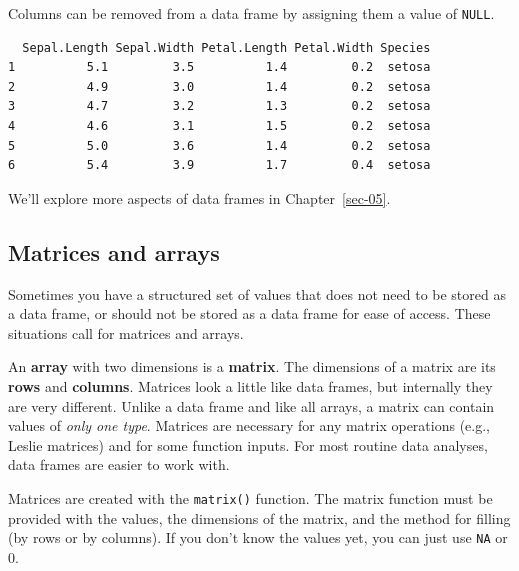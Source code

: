 \documentclass[
  13,
  letterpaper,
]{report}
\newenvironment{Shaded}{\begin{snugshade}}{\end{snugshade}}
\newcommand{\ConstantTok}[1]{\textcolor[rgb]{0.56,0.35,0.01}{#1}}
\newcommand{\FunctionTok}[1]{\textcolor[rgb]{0.28,0.35,0.67}{#1}}
\newcommand{\NormalTok}[1]{\textcolor[rgb]{0.00,0.23,0.31}{#1}}
\newcommand{\OtherTok}[1]{\textcolor[rgb]{0.00,0.23,0.31}{#1}}
\newcommand{\SpecialCharTok}[1]{\textcolor[rgb]{0.37,0.37,0.37}{#1}}
\begin{document}
Columns can be removed from a data frame by assigning them a value of
\texttt{NULL}.

\begin{Shaded}
\end{Shaded}

\begin{verbatim}
  Sepal.Length Sepal.Width Petal.Length Petal.Width Species
1          5.1         3.5          1.4         0.2  setosa
2          4.9         3.0          1.4         0.2  setosa
3          4.7         3.2          1.3         0.2  setosa
4          4.6         3.1          1.5         0.2  setosa
5          5.0         3.6          1.4         0.2  setosa
6          5.4         3.9          1.7         0.4  setosa
\end{verbatim}

We'll explore more aspects of data frames in Chapter~\ref{sec-05}.

\subsection{Matrices and arrays}\label{sec-03-struct-mat}

Sometimes you have a structured set of values that does not need to be
stored as a data frame, or should not be stored as a data frame for ease
of access. These situations call for matrices and arrays.

An \textbf{array} with two dimensions is a \textbf{matrix}. The
dimensions of a matrix are its \textbf{rows} and \textbf{columns}.
Matrices look a little like data frames, but internally they are very
different. Unlike a data frame and like all arrays, a matrix can contain
values of \emph{only one type}. Matrices are necessary for any matrix
operations (e.g., Leslie matrices) and for some function inputs. For
most routine data analyses, data frames are easier to work with.

Matrices are created with the \texttt{matrix()} function. The matrix
function must be provided with the values, the dimensions of the matrix,
and the method for filling (by rows or by columns). If you don't know
the values yet, you can just use \texttt{NA} or 0.
\end{document}
